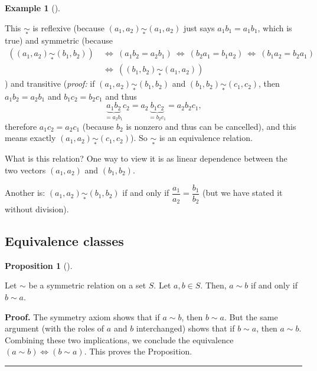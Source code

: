 \documentclass[numbers=enddot,12pt,final,onecolumn,notitlepage]{scrartcl}%
\numberwithin{exer}{subsection}
\theoremstyle{definition}
\newtheorem{prop}[theo]{Proposition}
\newenvironment{proposition}[1][]
{\begin{prop}[#1]\begin{leftbar}}
{\end{leftbar}\end{prop}}
\newtheorem{exam}[theo]{Example}
\newenvironment{example}[1][]
{\begin{exam}[#1]\begin{leftbar}}
{\end{leftbar}\end{exam}}
\newenvironment{proof}[1][Proof]{\noindent\textbf{#1.} }{\ \rule{0.5em}{0.5em}}
\begin{document}
\begin{example}
This $\underset{\ast}{\sim}$ is reflexive (because $\left(  a_{1}%
,a_{2}\right)  \underset{\ast}{\sim}\left(  a_{1},a_{2}\right)  $ just says
$a_{1}b_{1}=a_{1}b_{1}$, which is true) and symmetric (because
\begin{align*}
\left(  \left(  a_{1},a_{2}\right)  \underset{\ast}{\sim}\left(  b_{1}%
,b_{2}\right)  \right)  \  &  \Longleftrightarrow\ \left(  a_{1}b_{2}%
=a_{2}b_{1}\right)  \ \Longleftrightarrow\ \left(  b_{2}a_{1}=b_{1}%
a_{2}\right)  \ \Longleftrightarrow\ \left(  b_{1}a_{2}=b_{2}a_{1}\right) \\
&  \Longleftrightarrow\ \left(  \left(  b_{1},b_{2}\right)  \underset{\ast
}{\sim}\left(  a_{1},a_{2}\right)  \right)
\end{align*}
) and transitive (\textit{proof:} if $\left(  a_{1},a_{2}\right)
\underset{\ast}{\sim}\left(  b_{1},b_{2}\right)  $ and $\left(  b_{1}%
,b_{2}\right)  \underset{\ast}{\sim}\left(  c_{1},c_{2}\right)  $, then
$a_{1}b_{2}=a_{2}b_{1}$ and $b_{1}c_{2}=b_{2}c_{1}$ and thus%
\[
\underbrace{a_{1}b_{2}}_{=a_{2}b_{1}}c_{2}=a_{2}\underbrace{b_{1}c_{2}%
}_{=b_{2}c_{1}}=a_{2}b_{2}c_{1},
\]
therefore $a_{1}c_{2}=a_{2}c_{1}$ (because $b_{2}$ is nonzero and thus can be
cancelled), and this means exactly $\left(  a_{1},a_{2}\right)  \underset{\ast
}{\sim}\left(  c_{1},c_{2}\right)  $). So $\underset{\ast}{\sim}$ is an
equivalence relation.

What is this relation? One way to view it is as linear dependence between the
two vectors $\left(  a_{1},a_{2}\right)  $ and $\left(  b_{1},b_{2}\right)  $.

Another is: $\left(  a_{1},a_{2}\right)  \underset{\ast}{\sim}\left(
b_{1},b_{2}\right)  $ if and only if $\dfrac{a_{1}}{a_{2}}=\dfrac{b_{1}}%
{b_{2}}$ (but we have stated it without division).
\end{example}

\subsection{Equivalence classes}

\begin{proposition}
Let $\sim$ be a symmetric relation on a set $S$. Let $a,b\in S$. Then, $a\sim
b$ if and only if $b\sim a$.
\end{proposition}

\begin{proof}
The symmetry axiom shows that if $a\sim b$, then $b\sim a$. But the same
argument (with the roles of $a$ and $b$ interchanged) shows that if $b\sim a$,
then $a\sim b$. Combining these two implications, we conclude the equivalence
$\left(  a\sim b\right)  \Longleftrightarrow\left(  b\sim a\right)  $. This
proves the Proposition.
\end{proof}
\end{document}

